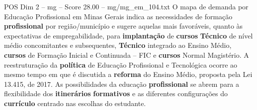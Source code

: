 \begin{textsample}{POS Dim 2 – mg – Score 28.00 – mg/mg\_em\_104.txt}
O mapa de demanda por Educação Profissional em Minas Gerais indica as necessidades de formação \textbf{profissional} por região/município e sugere aquelas mais favoráveis, quanto às expectativas de empregabilidade, para \textbf{implantação} de \textbf{cursos} \textbf{Técnico} de nível médio concomitantes e subsequentes, \textbf{Técnico} integrado ao Ensino Médio, \textbf{cursos} de Formação Inicial e Continuada – FIC e \textbf{cursos} Normal Magistério.
A reestruturação da \textbf{política} de Educação Profissional e Tecnológica ocorre ao mesmo tempo em que é discutida a \textbf{reforma} do Ensino Médio, proposta pela Lei 13.415, de 2017.
As possibilidades da educação \textbf{profissional} se abrem para a flexibilidade dos \textbf{itinerários} \textbf{formativos} e as diferentes configurações do \textbf{currículo} centrado nas escolhas do estudante.

\end{textsample}
